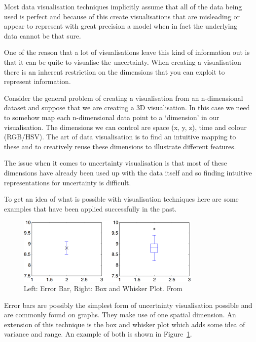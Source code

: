 \documentclass[
  oneside,
  11pt, a4paper,
  footinclude=true,
  headinclude=true,
  cleardoublepage=empty
]{scrbook}
\begin{document}
Most data visualisation techniques implicitly assume that all of the data being used is perfect and because of this create visualisations that are misleading or appear to represent with great precision a model when in fact the underlying data cannot be that sure.

One of the reason that a lot of visualisations leave this kind of information out is that it can be quite to visualise the uncertainty. When creating a visualisation there is an inherent restriction on the dimensions that you can exploit to represent information.

Consider the general problem of creating a visualisation from an n-dimensional dataset and suppose that we are creating a 3D visualisation. In this case we need to somehow map each n-dimensional data point to a ‘dimension’ in our visualisation. The dimensions we can control are space (x, y, z), time and colour (RGB/HSV). The art of data visualisation is to find an intuitive mapping to these and to creatively reuse these dimensions to illustrate different features.

The issue when it comes to uncertainty visualisation is that most of these dimensions have already been used up with the data itself and so finding intuitive representations for uncertainty is difficult.

To get an idea of what is possible with visualisation techniques here are some examples that have been applied successfully in the past.

\begin{figure}[h]
    \centering
	\includegraphics[width=0.8\textwidth]{images/error_bars.png}
    \caption{Left: Error Bar, Right: Box and Whisker Plot. From \cite{uncertaintyoverview}}
    \label{fig:error_bars}
\end{figure}

Error bars are possibly the simplest form of uncertainty visualisation possible and are commonly found on graphs. They make use of one spatial dimension. An extension of this technique is the box and whisker plot which adds some idea of variance and range. An example of both is shown in Figure~\ref{fig:error_bars}.
\end{document}
